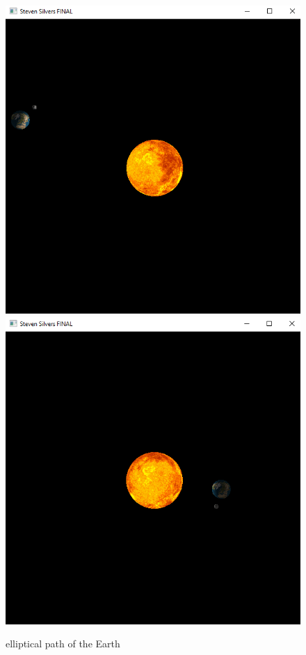 \documentclass[12pt,serif,draftclsnofoot,onecolumn]{IEEEtran}
\begin{document}
	\begin{figure}[h]
		\includegraphics[scale=.5]{cap3}
		\includegraphics[scale=.5]{cap1}
		\caption{elliptical path of the Earth}
	\end{figure}
\end{document}
